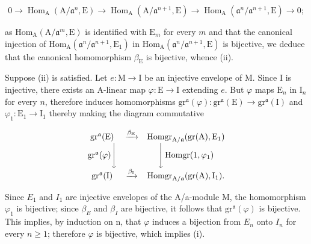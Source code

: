 \[
0 \to \operatorname{Hom} _ {\mathrm{A}} (\mathrm{A} / \mathfrak {a} ^ {n}, \mathrm{E}) \longrightarrow \operatorname{Hom} _ {\mathrm{A}} (\mathrm{A} / \mathfrak {a} ^ {n + 1}, \mathrm{E}) \longrightarrow \operatorname{Hom} _ {\mathrm{A}} (\mathfrak {a} ^ {n} / \mathfrak {a} ^ {n + 1}, \mathrm{E}) \to 0;
\]

as \(\mathrm{Hom}_{\mathrm{A}}(\mathrm{A}/\mathfrak{a}^{m},\mathrm{E})\) is identified with \(\mathrm{E}_{m}\) for every \(m\) and that the canonical injection of \(\mathrm{Hom}_{\mathrm{A}}(\mathfrak{a}^{n}/\mathfrak{a}^{n+1},\mathrm{E}_{1})\) in \(\mathrm{Hom}_{\mathrm{A}}(\mathfrak{a}^{n}/\mathfrak{a}^{n+1},\mathrm{E})\) is bijective, we deduce that the canonical homomorphism \(\beta_{\mathrm{E}}\) is bijective, whence (ii).

Suppose (ii) is satisfied. Let \(e: \mathrm{M} \to \mathrm{I}\) be an injective envelope of M. Since I is injective, there exists an A-linear map \(\varphi: \mathrm{E} \to \mathrm{I}\) extending \(e\). But \(\varphi\) maps \(\mathrm{E}_n\) in \(\mathrm{I}_n\) for every \(n\), therefore induces homomorphisms \(\mathrm{gr}^{\mathfrak{a}}(\varphi):\mathrm{gr}^{\mathfrak{a}}(\mathrm{E})\to \mathrm{gr}^{\mathfrak{a}}(\mathrm{I})\) and \(\varphi_{1}:\mathrm{E}_{1}\rightarrow \mathrm{I}_{1}\) thereby making the diagram commutative

\[
\begin{array}{c c c} \operatorname{gr} ^ {\mathfrak {a}} (\mathrm{E}) & \xrightarrow {\beta_ {\mathrm{E}}} & \operatorname{Homgr} _ {\mathrm{A} / \mathfrak {a}} (\operatorname{gr} (\mathrm{A}), \mathrm{E} _ {1}) \\ \operatorname{gr} ^ {\mathfrak {a}} (\varphi) \Bigg \downarrow & & \Bigg \downarrow \operatorname{Homgr} (1, \varphi_ {1}) \\ \operatorname{gr} ^ {\mathfrak {a}} (\mathrm{I}) & \xrightarrow {\beta_ {\mathrm{I}}} & \operatorname{Homgr} _ {\mathrm{A} / \mathfrak {a}} (\operatorname{gr} (\mathrm{A}), \mathrm{I} _ {1}). \end{array}
\]

Since \(E_{1}\) and \(I_{1}\) are injective envelopes of the A/a-module M, the homomorphism \(\varphi_{1}\) is bijective; since \(\beta_{E}\) and \(\beta_{I}\) are bijective, it follows that \(\mathrm{gr}^{\mathfrak{a}}(\varphi)\) is bijective. This implies, by induction on n, that \(\varphi\) induces a bijection from \(E_{n}\) onto \(I_{n}\) for every \(n \geqslant 1\); therefore \(\varphi\) is bijective, which implies (i).

